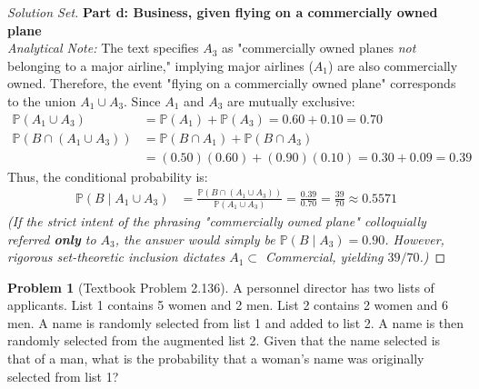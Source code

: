 \documentclass[11pt, letterpaper]{article}
\theoremstyle{definition}
\newtheorem{problem}{Problem}
\renewcommand{\P}{\mathbb{P}}
\begin{document}
\begin{proof}[Solution Set]
\textbf{Part d: Business, given flying on a commercially owned plane} \\
\textit{Analytical Note:} The text specifies $A_3$ as "commercially owned planes \textit{not} belonging to a major airline," implying major airlines ($A_1$) are also commercially owned. Therefore, the event "flying on a commercially owned plane" corresponds to the union $A_1 \cup A_3$.
Since $A_1$ and $A_3$ are mutually exclusive:
\begin{align*}
    \P(A_1 \cup A_3) &= \P(A_1) + \P(A_3) = 0.60 + 0.10 = 0.70 \\
    \P(B \cap (A_1 \cup A_3)) &= \P(B \cap A_1) + \P(B \cap A_3) \\
    &= (0.50)(0.60) + (0.90)(0.10) = 0.30 + 0.09 = 0.39
\end{align*}
Thus, the conditional probability is:
\begin{align*}
    \P(B \mid A_1 \cup A_3) &= \frac{\P(B \cap (A_1 \cup A_3))}{\P(A_1 \cup A_3)} = \frac{0.39}{0.70} = \frac{39}{70} \approx 0.5571
\end{align*}
\textit{(If the strict intent of the phrasing "commercially owned plane" colloquially referred \textbf{only} to $A_3$, the answer would simply be $\P(B \mid A_3) = 0.90$. However, rigorous set-theoretic inclusion dictates $A_1 \subset$ Commercial, yielding $39/70$.)}
\end{proof}

\vspace{0.5cm}

\begin{problem}[Textbook Problem 2.136]
A personnel director has two lists of applicants. List 1 contains 5 women and 2 men. List 2 contains 2 women and 6 men. A name is randomly selected from list 1 and added to list 2. A name is then randomly selected from the augmented list 2. Given that the name selected is that of a man, what is the probability that a woman's name was originally selected from list 1?
\end{problem}
\end{document}
